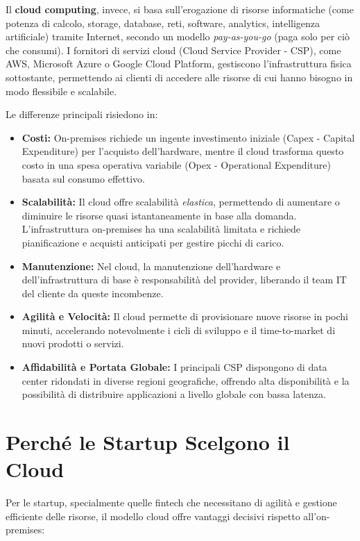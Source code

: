 Il \textbf{cloud computing}, invece, si basa sull'erogazione di risorse informatiche (come potenza di calcolo, storage, database, reti, software, analytics, intelligenza artificiale) tramite Internet, secondo un modello \textit{pay-as-you-go} (paga solo per ciò che consumi). I fornitori di servizi cloud (Cloud Service Provider - CSP), come AWS, Microsoft Azure o Google Cloud Platform, gestiscono l'infrastruttura fisica sottostante, permettendo ai clienti di accedere alle risorse di cui hanno bisogno in modo flessibile e scalabile.

Le differenze principali risiedono in:
\begin{itemize}
    \item \textbf{Costi:} On-premises richiede un ingente investimento iniziale (Capex - Capital Expenditure) per l'acquisto dell'hardware, mentre il cloud trasforma questo costo in una spesa operativa variabile (Opex - Operational Expenditure) basata sul consumo effettivo.
    \item \textbf{Scalabilità:} Il cloud offre scalabilità \textit{elastica}, permettendo di aumentare o diminuire le risorse quasi istantaneamente in base alla domanda. L'infrastruttura on-premises ha una scalabilità limitata e richiede pianificazione e acquisti anticipati per gestire picchi di carico.
    \item \textbf{Manutenzione:} Nel cloud, la manutenzione dell'hardware e dell'infrastruttura di base è responsabilità del provider, liberando il team IT del cliente da queste incombenze.
    \item \textbf{Agilità e Velocità:} Il cloud permette di provisionare nuove risorse in pochi minuti, accelerando notevolmente i cicli di sviluppo e il time-to-market di nuovi prodotti o servizi.
    \item \textbf{Affidabilità e Portata Globale:} I principali CSP dispongono di data center ridondati in diverse regioni geografiche, offrendo alta disponibilità e la possibilità di distribuire applicazioni a livello globale con bassa latenza.
\end{itemize}

\section{Perché le Startup Scelgono il Cloud}
\label{sec:startup-cloud-choice}

Per le startup, specialmente quelle fintech che necessitano di agilità e gestione efficiente delle risorse, il modello cloud offre vantaggi decisivi rispetto all'on-premises:


